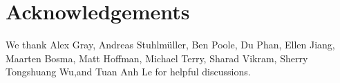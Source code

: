 \section{Acknowledgements}
We thank Alex Gray, Andreas Stuhlmüller, Ben Poole, Du Phan, Ellen Jiang, Maarten Bosma, Matt Hoffman, Michael Terry, Sharad Vikram, Sherry Tongshuang Wu,and Tuan Anh Le for helpful discussions.